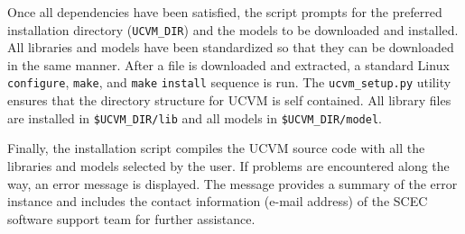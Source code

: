 Once all dependencies have been satisfied, the script prompts for the preferred installation directory (\texttt{UCVM\_DIR}) and the models to be downloaded and installed. All libraries and models have been standardized so that they can be downloaded in the same manner. After a file is downloaded and extracted, a standard Linux \texttt{configure}, \texttt{make}, and \texttt{make} \texttt{install} sequence is run. The \texttt{ucvm\_setup.py} utility ensures that the directory structure for UCVM is self contained. All library files are installed in \texttt{\$UCVM\_DIR/lib} and all models in \texttt{\$UCVM\_DIR/model}.

Finally, the installation script compiles the UCVM source code with all the libraries and models selected by the user. If problems are encountered along the way, an error message is displayed. The message provides a summary of the error instance and includes the contact information (e-mail address) of the SCEC software support team for further assistance.



